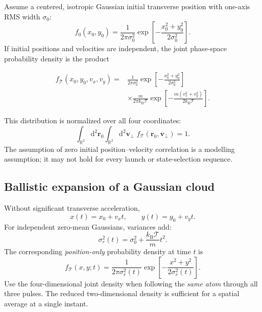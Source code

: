 \documentclass[11pt,a4paper]{article}
\numberwithin{equation}{section}
\newcommand{\Tat}{\mathcal{T}}
\newcommand{\kb}{k_{\mathrm B}}
\newcommand{\dd}{\mathrm{d}}
\begin{document}
Assume a centered, isotropic Gaussian initial transverse position with
one-axis RMS width $\sigma_0$:
\begin{equation}\label{eq:fr0}
 f_0(x_0,y_0)=\frac{1}{2\pi\sigma_0^2}
 \exp\left[-\frac{x_0^2+y_0^2}{2\sigma_0^2}\right].
\end{equation}
If initial positions and velocities are independent, the joint phase-space
probability density is the product
\begin{keybox}
\begin{equation}\label{eq:f4d}
\boxed{\begin{aligned}
f_{\Tat}(x_0,y_0,v_x,v_y)
={}&\frac{1}{2\pi\sigma_0^2}
 \exp\left[-\frac{x_0^2+y_0^2}{2\sigma_0^2}\right]\\
&\times\frac{m}{2\pi\kb\Tat}
 \exp\left[-\frac{m(v_x^2+v_y^2)}{2\kb\Tat}\right].
\end{aligned}}
\end{equation}
\end{keybox}
This distribution is normalized over all four coordinates:
\begin{equation}
\int_{\mathbb R^2}\dd^2\bm r_0\int_{\mathbb R^2}\dd^2\bm v_\perp\;
 f_{\Tat}(\bm r_0,\bm v_\perp)=1.
\end{equation}
The assumption of zero initial position--velocity correlation is a modelling
assumption; it may not hold for every launch or state-selection sequence.

\subsection{Ballistic expansion of a Gaussian cloud}

Without significant transverse acceleration,
\begin{equation}
 x(t)=x_0+v_x t,\qquad y(t)=y_0+v_y t.
\end{equation}
For independent zero-mean Gaussians, variances add:
\begin{equation}\label{eq:cloudsigma}
\boxed{\sigma_r^2(t)=\sigma_0^2+\frac{\kb\Tat}{m}t^2.}
\end{equation}
The corresponding \emph{position-only} probability density at time $t$ is
\begin{equation}\label{eq:frt}
\boxed{f_{\Tat}(x,y;t)=\frac{1}{2\pi\sigma_r^2(t)}
\exp\left[-\frac{x^2+y^2}{2\sigma_r^2(t)}\right].}
\end{equation}
Use the four-dimensional joint density when following the \emph{same atom}
through all three pulses. The reduced two-dimensional density is sufficient
for a spatial average at a single instant.
\end{document}
